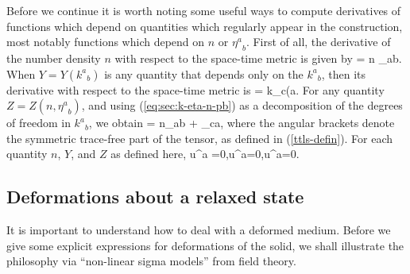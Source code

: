 
Before we continue it is worth noting some useful ways to compute derivatives of functions which depend on quantities which regularly appear in the construction, most notably functions which depend on $n$ or ${\eta^a}_b$.
First of all, the derivative of the number density $n$ with respect to the space-time metric is given by
\bea
\label{eq:sec:dndg}
 = \half n \gamma_{ab}.
\eea
When $Y = Y({k^a}_b)$ is any quantity that depends only on the ${k^a}_b$,  then its derivative with respect to the space-time metric is
\bea
\label{eq:pd-Y-g-k}
 = k_{c(a}.
\eea
For any quantity $Z = Z(n,{\eta^a}_b)$, and using (\ref{eq:sec:k-eta-n-pb}) as a decomposition of the degrees of freedom in ${k^a}_b$, we obtain
\bea
\label{eq:sec:Zneta}
 = \half n\gamma_{ab} + \eta_{c\langle a},
\eea
where the angular brackets denote the symmetric trace-free part of the tensor, as defined in (\ref{ttls-defin}). For each quantity $n$, $Y$, and $Z$ as defined here,
\bea
u^a =0,\qquad u^a=0,\qquad u^a=0.
\eea
 



\subsection{Deformations about a relaxed state}
It is   important to understand how to deal with a deformed medium. Before we give some explicit expressions for  deformations of the solid, we shall illustrate the philosophy via ``non-linear sigma models'' from field theory.
